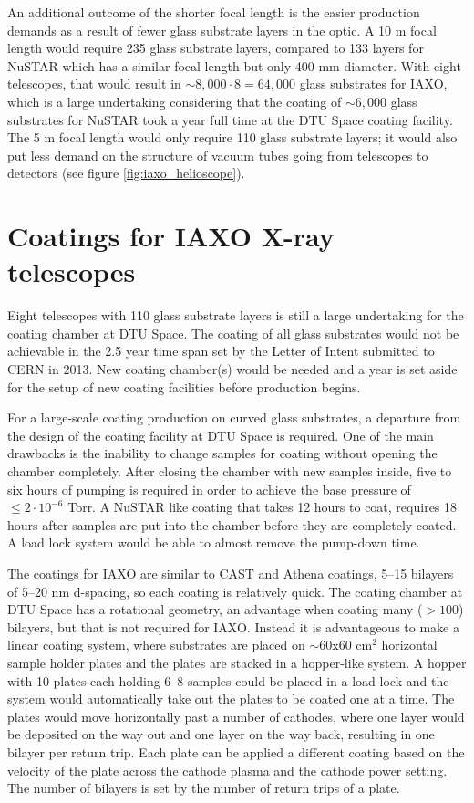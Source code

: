 An additional outcome of the shorter focal length is the easier production demands as a result of fewer glass substrate layers in the optic. A 10 m focal length would require 235 glass substrate layers, compared to 133 layers for NuSTAR which has a similar focal length but only 400 mm diameter. With eight telescopes, that would result in $\sim8,000\cdot8=64,000$ glass substrates for IAXO, which is a large undertaking considering that the coating of $\sim6,000$ glass substrates for NuSTAR took a year full time at the DTU Space coating facility. The 5 m focal length would only require 110 glass substrate layers; it would also put less demand on the structure of vacuum tubes going from telescopes to detectors (see figure \ref{fig:iaxo_helioscope}).

\section{Coatings for IAXO X-ray telescopes}
Eight telescopes with 110 glass substrate layers is still a large undertaking for the coating chamber at DTU Space. The coating of all glass substrates would not be achievable in the 2.5 year time span set by the Letter of Intent\cite{Irastorza:2013uu} submitted to CERN in 2013. New coating chamber(s) would be needed and a year is set aside for the setup of new coating facilities before production begins.

For a large-scale coating production on curved glass substrates, a departure from the design of the coating facility at DTU Space is required. One of the main drawbacks is the inability to change samples for coating without opening the chamber completely. After closing the chamber with new samples inside, five to six hours of pumping is required in order to achieve the base pressure of $\leq 2\cdot10^{-6}$ Torr. A NuSTAR like coating that takes 12 hours to coat, requires 18 hours after samples are put into the chamber before they are completely coated. A load lock system would be able to almost remove the pump-down time.

The coatings for IAXO are similar to CAST and Athena coatings, 5--15 bilayers of 5--20 nm d-spacing, so each coating is relatively quick. The coating chamber at DTU Space has a rotational geometry, an advantage when coating many ($>100$) bilayers, but that is not required for IAXO. Instead it is advantageous to make a linear coating system, where substrates are placed on $\sim$60x60 cm$^2$ horizontal sample holder plates and the plates are stacked in a hopper-like system. A hopper with 10 plates each holding 6--8 samples could be placed in a load-lock and the system would automatically take out the plates to be coated one at a time. The plates would move horizontally past a number of cathodes, where one layer would be deposited on the way out and one layer on the way back, resulting in one bilayer per return trip. Each plate can be applied a different coating based on the velocity of the plate across the cathode plasma and the cathode power setting. The number of bilayers is set by the number of return trips of a plate.

